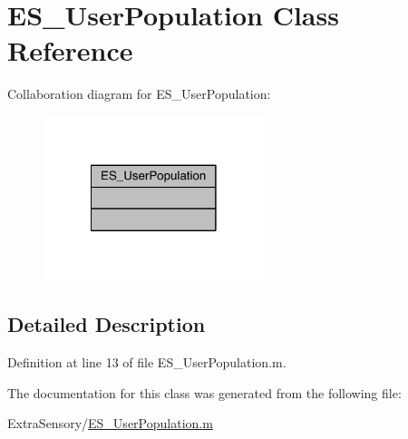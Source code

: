 \hypertarget{class_e_s___user_population}{\section{E\+S\+\_\+\+User\+Population Class Reference}
\label{class_e_s___user_population}
}


Collaboration diagram for E\+S\+\_\+\+User\+Population\+:\nopagebreak
\begin{figure}[H]
\begin{center}
\leavevmode
\includegraphics[width=182pt]{db/d24/class_e_s___user_population__coll__graph}
\end{center}
\end{figure}


\subsection{Detailed Description}


Definition at line 13 of file E\+S\+\_\+\+User\+Population.\+m.



The documentation for this class was generated from the following file\+:\begin{DoxyCompactItemize}
\item 
Extra\+Sensory/\hyperlink{_e_s___user_population_8m}{E\+S\+\_\+\+User\+Population.\+m}\end{DoxyCompactItemize}
